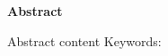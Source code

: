 \begin{center}
\bfseries \fontsize{24}{12} \selectfont Abstract
\end{center}
\vspace*{1\baselineskip}
Abstract content
Keywords: